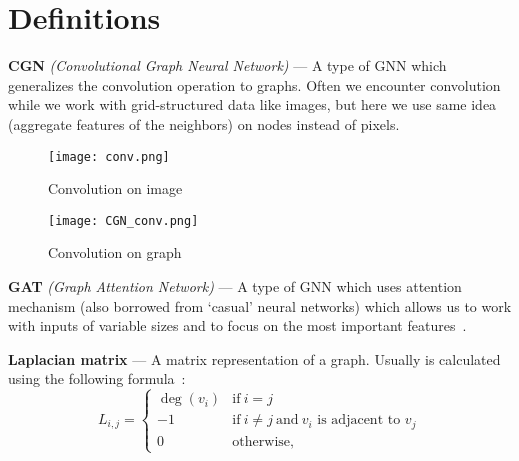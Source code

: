 \section{Definitions}

\textbf{CGN} \textit{(Convolutional Graph Neural Network)} --- A type of GNN which generalizes the convolution operation to graphs.
Often we encounter convolution while we work with grid-structured data like images, but here we use same idea (aggregate features of the neighbors) on nodes instead of pixels\cite{9046288}.

\begin{figure}[h]
    \begin{multicols}{2}
        \centering
        \texttt{[image: conv.png]}
        \caption{Convolution on image}
    
        \centering
        \texttt{[image: CGN\_conv.png]}
        \caption{Convolution on graph}
    \end{multicols}
\end{figure}

\textbf{GAT} \textit{(Graph Attention Network)} --- A type of GNN which uses attention mechanism (also borrowed from `casual' neural networks) which allows us to work with inputs of variable sizes and to focus on the most important features~\cite{velickovic2018graph}. 

\textbf{Laplacian matrix} --- A matrix representation of a graph.
Usually is calculated using the following formula~\cite{wiki_laplacian}:
\begin{equation*}
    L_{i, j} = 
    \begin{cases}
        \deg(v_i) & \mbox{if}\ i = j \\
        -1 & \mbox{if}\ i \neq j\ \mbox{and}\ v_i \mbox{ is adjacent to } v_j \\
        0 & \mbox{otherwise},
\end{cases}
\end{equation*}
